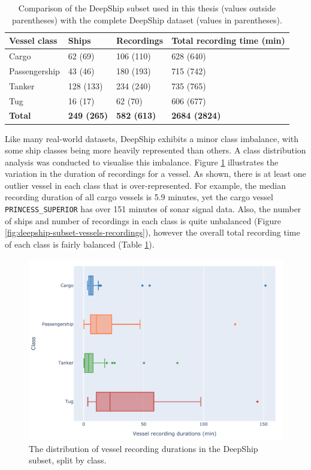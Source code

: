 \begin{table}[htb]
\centering
\caption{Comparison of the DeepShip subset used in this thesis (values outside parentheses) with the complete DeepShip dataset (values in parentheses).}
\label{tab:deepship-subset}
\begin{tabular}{llll}
\toprule
\textbf{Vessel class} & \textbf{Ships} & \textbf{Recordings} & \textbf{Total recording time (min)} \\ \midrule
Cargo & 62 (69) & 106 (110) & 628 (640) \\
Passengership & 43 (46) & 180 (193) & 715 (742) \\
Tanker & 128 (133) & 234 (240) & 735 (765) \\
Tug & 16 (17) & 62 (70) & 606 (677) \\
\textbf{Total} & \textbf{249 (265)} & \textbf{582 (613)} & \textbf{2684 (2824)} \\ \bottomrule
\end{tabular}
\end{table}

Like many real-world datasets, DeepShip exhibits a minor class imbalance, with some ship classes being more heavily represented than others. A class distribution analysis was conducted to visualise this imbalance. Figure \ref{fig:deepship-subset-recording-length} illustrates the variation in the duration of recordings for a vessel. As shown, there is at least one outlier vessel in each class that is over-represented. For example, the median recording duration of all cargo vessels is 5.9 minutes, yet the cargo vessel \texttt{PRINCESS\_SUPERIOR} has over 151 minutes of sonar signal data. Also, the number of ships and number of recordings in each class is quite unbalanced (Figure \ref{fig:deepship-subset-vessels-recordings}), however the overall total recording time of each class is fairly balanced (Table \ref{tab:deepship-subset}).

\begin{figure}[p]
    \centering
    \includegraphics[width=\textwidth]{img/ch3/deepship_figs/deepship_duration_spread.pdf}
    \caption{The distribution of vessel recording durations in the DeepShip subset, split by class.}
    \label{fig:deepship-subset-recording-length}
\end{figure}

